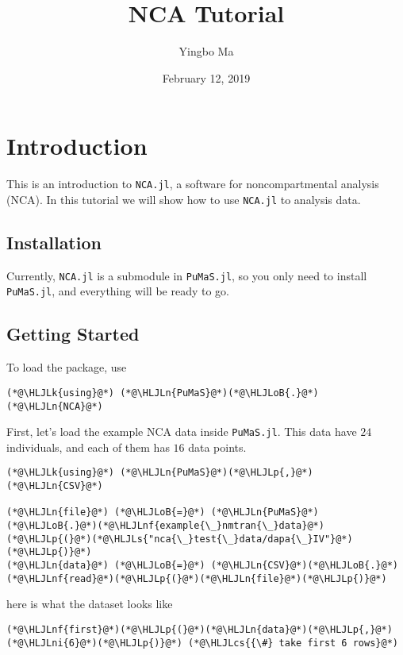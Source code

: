 \documentclass[12pt,a4paper]{article}
\title{ NCA Tutorial }
\author{ Yingbo Ma }
\date{ February 12, 2019 }
\newcommand{\HLJLk}[1]{\textcolor[RGB]{148,91,176}{\textbf{#1}}}
\newcommand{\HLJLn}[1]{#1}
\newcommand{\HLJLnf}[1]{\textcolor[RGB]{66,102,213}{#1}}
\newcommand{\HLJLs}[1]{\textcolor[RGB]{201,61,57}{#1}}
\newcommand{\HLJLni}[1]{\textcolor[RGB]{59,151,46}{#1}}
\newcommand{\HLJLoB}[1]{\textcolor[RGB]{102,102,102}{\textbf{#1}}}
\newcommand{\HLJLp}[1]{#1}
\newcommand{\HLJLcs}[1]{\textcolor[RGB]{153,153,119}{\textit{#1}}}
\begin{document}
\maketitle

\section{Introduction}
This is an introduction to \texttt{NCA.jl}, a software for noncompartmental analysis (NCA). In this tutorial we will show how to use \texttt{NCA.jl} to analysis data.

\subsection{Installation}
Currently, \texttt{NCA.jl} is a submodule in \texttt{PuMaS.jl}, so you only need to install \texttt{PuMaS.jl}, and everything will be ready to go.

\subsection{Getting Started}
To load the package, use


\begin{lstlisting}
(*@\HLJLk{using}@*) (*@\HLJLn{PuMaS}@*)(*@\HLJLoB{.}@*)(*@\HLJLn{NCA}@*)
\end{lstlisting}


First, let's load the example NCA data inside \texttt{PuMaS.jl}. This data have $24$ individuals, and each of them has $16$ data points.


\begin{lstlisting}
(*@\HLJLk{using}@*) (*@\HLJLn{PuMaS}@*)(*@\HLJLp{,}@*) (*@\HLJLn{CSV}@*)

(*@\HLJLn{file}@*) (*@\HLJLoB{=}@*) (*@\HLJLn{PuMaS}@*)(*@\HLJLoB{.}@*)(*@\HLJLnf{example{\_}nmtran{\_}data}@*)(*@\HLJLp{(}@*)(*@\HLJLs{"nca{\_}test{\_}data/dapa{\_}IV"}@*)(*@\HLJLp{)}@*)
(*@\HLJLn{data}@*) (*@\HLJLoB{=}@*) (*@\HLJLn{CSV}@*)(*@\HLJLoB{.}@*)(*@\HLJLnf{read}@*)(*@\HLJLp{(}@*)(*@\HLJLn{file}@*)(*@\HLJLp{)}@*)
\end{lstlisting}


here is what the dataset looks like


\begin{lstlisting}
(*@\HLJLnf{first}@*)(*@\HLJLp{(}@*)(*@\HLJLn{data}@*)(*@\HLJLp{,}@*) (*@\HLJLni{6}@*)(*@\HLJLp{)}@*) (*@\HLJLcs{{\#} take first 6 rows}@*)
\end{lstlisting}
\end{document}
